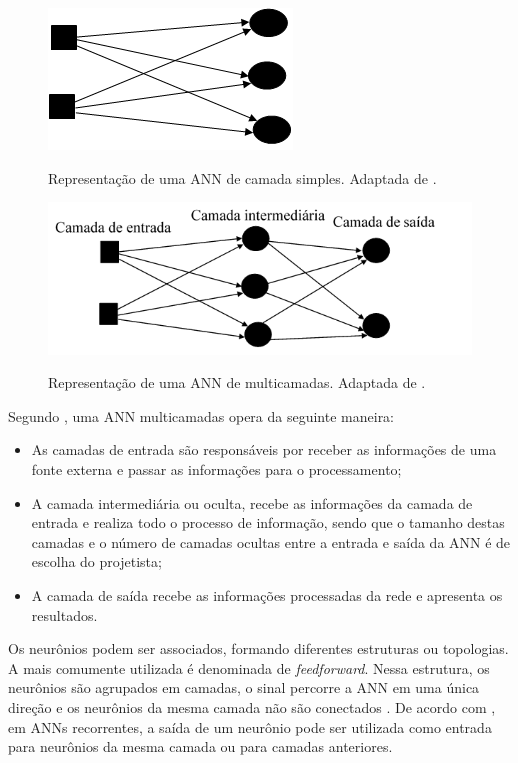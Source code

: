 \begin{figure}[H]
	\centering
	{\includegraphics[width=0.3\linewidth]{tatiane/fig_tati/redeneural/camsimp.png}} 
	\caption{Representação de uma ANN de camada simples. Adaptada de 
	.} 
	\label{fig:cams}
\end{figure}

\begin{figure}[H]
	\centering
	{\includegraphics[width=0.6\linewidth]{tatiane/fig_tati/redeneural/multicamadas}}\caption{Representação de uma ANN de multicamadas. Adaptada de .} 
	\label{fig:multcama}
\end{figure}

Segundo , uma ANN multicamadas opera da seguinte maneira:

\begin{itemize}
\item As camadas de entrada são responsáveis por receber as informações de uma fonte externa e passar as informações para o processamento;
\item A camada intermediária ou oculta, recebe as informações da camada de entrada e realiza todo o processo de informação, sendo que o tamanho destas camadas e o número de camadas ocultas entre a entrada e saída da ANN é de escolha do projetista; 
\item A camada de saída recebe as informações processadas da rede e apresenta os resultados.

\end{itemize}

Os neurônios podem ser associados, formando diferentes estruturas ou topologias. A mais comumente utilizada é denominada de {\it feedforward}. Nessa estrutura, os neurônios são agrupados em camadas, o sinal percorre a ANN em uma única direção e os neurônios da mesma camada não são conectados \cite{Simpson2001}. De acordo com , em ANNs recorrentes, a saída de um neurônio pode ser utilizada como entrada para neurônios da mesma camada ou para camadas anteriores.

